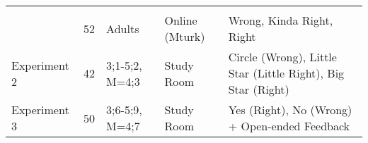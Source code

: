 \documentclass[,man,floatsintext]{apa6}
\begin{document}
\begin{longtable}[]{@{}lllll@{}}
\begin{minipage}[t]{0.34\columnwidth}
\end{minipage}\tabularnewline
\begin{minipage}[t]{0.16\columnwidth}\raggedright
\strut
\end{minipage} & \begin{minipage}[t]{0.01\columnwidth}\raggedright
52\strut
\end{minipage} & \begin{minipage}[t]{0.17\columnwidth}\raggedright
Adults\strut
\end{minipage} & \begin{minipage}[t]{0.17\columnwidth}\raggedright
Online (Mturk)\strut
\end{minipage} & \begin{minipage}[t]{0.34\columnwidth}\raggedright
Wrong, Kinda Right, Right\strut
\end{minipage}\tabularnewline
\begin{minipage}[t]{0.16\columnwidth}\raggedright
Experiment 2\strut
\end{minipage} & \begin{minipage}[t]{0.01\columnwidth}\raggedright
42\strut
\end{minipage} & \begin{minipage}[t]{0.17\columnwidth}\raggedright
3;1-5;2, M=4;3\strut
\end{minipage} & \begin{minipage}[t]{0.17\columnwidth}\raggedright
Study Room\strut
\end{minipage} & \begin{minipage}[t]{0.34\columnwidth}\raggedright
Circle (Wrong), Little Star (Little Right), Big Star (Right)\strut
\end{minipage}\tabularnewline
\begin{minipage}[t]{0.16\columnwidth}\raggedright
Experiment 3\strut
\end{minipage} & \begin{minipage}[t]{0.01\columnwidth}\raggedright
50\strut
\end{minipage} & \begin{minipage}[t]{0.17\columnwidth}\raggedright
3;6-5;9, M=4;7\strut
\end{minipage} & \begin{minipage}[t]{0.17\columnwidth}\raggedright
Study Room\strut
\end{minipage} & \begin{minipage}[t]{0.34\columnwidth}\raggedright
Yes (Right), No (Wrong) + Open-ended Feedback\strut
\end{minipage}\tabularnewline
\bottomrule
\end{longtable}
\end{document}
